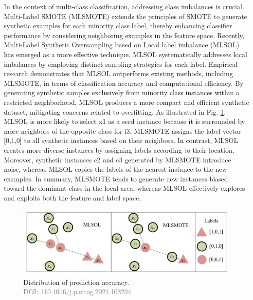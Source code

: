 In the context of multi-class classification, addressing class imbalances is crucial. Multi-Label SMOTE (MLSMOTE) extends the principles of SMOTE to generate synthetic examples for each minority class label, thereby enhancing classifier performance by considering neighboring examples in the feature space. Recently, Multi-Label Synthetic Oversampling based on Local label imbalance (MLSOL) has emerged as a more effective technique. MLSOL systematically addresses local imbalances by employing distinct sampling strategies for each label. Empirical research demonstrates that MLSOL outperforms existing methods, including MLSMOTE, in terms of classification accuracy and computational efficiency. By generating synthetic samples exclusively from minority class instances within a restricted neighborhood, MLSOL produces a more compact and efficient synthetic dataset, mitigating concerns related to overfitting.
As illustrated in Fig. \ref{fig:mlsmote_mlsol}, MLSOL is more likely to select x1 as a seed instance because it is surrounded by more neighbors of the opposite class for l3. MLSMOTE assigns the label vector [0,1,0] to all synthetic instances based on their neighbors. In contrast, MLSOL creates more diverse instances by assigning labels according to their location. Moreover, synthetic instances c2 and c3 generated by MLSMOTE introduce noise, whereas MLSOL copies the labels of the nearest instance to the new examples. In summary, MLSMOTE tends to generate new instances biased toward the dominant class in the local area, whereas MLSOL effectively explores and exploits both the feature and label space.
\begin{figure}[!ht]

    \begin{center}
      \includegraphics[width=1\textwidth]{3_State-of-the-art/fig/mlsmote_mlsol.png}
    \end{center}

    \caption{Distribution of prediction accuracy. \\ \textcolor{gray}{\fontsize{10}{0}\selectfont DOI: 110.1016/j.patcog.2021.108294}}
    \label{fig:mlsmote_mlsol}

    \end{figure}
    
